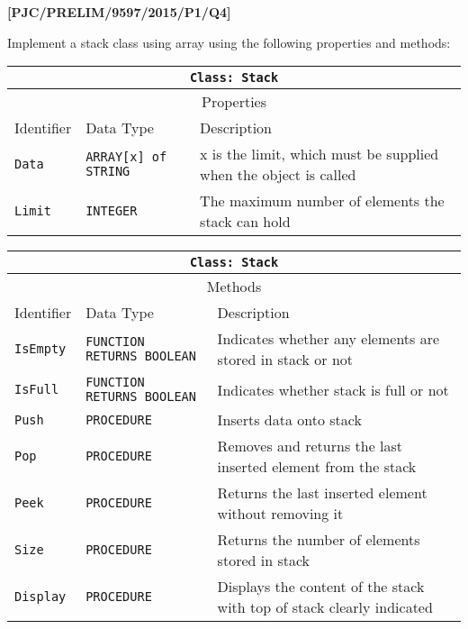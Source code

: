 \item \textbf{{[}PJC/PRELIM/9597/2015/P1/Q4{]} }

Implement a stack class using array using the following properties
and methods: 
\begin{center}
\begin{tabular}{|l|l|l|}
\hline 
\multicolumn{3}{|c|}{\texttt{Class: Stack}}\tabularnewline
\hline 
\multicolumn{3}{|c|}{Properties}\tabularnewline
\hline 
\texttt{\hspace{0.01\columnwidth}}Identifier & \texttt{\hspace{0.01\columnwidth}}Data Type & \texttt{\hspace{0.05\columnwidth}}Description\tabularnewline
\hline 
\texttt{Data} & \texttt{ARRAY{[}x{]} of STRING} & x is the limit, which must be supplied when the object is called \tabularnewline
\hline 
\texttt{Limit} & \texttt{INTEGER} & The maximum number of elements the stack can hold \tabularnewline
\hline 
\end{tabular}
\par\end{center}

\begin{center}
\begin{tabular}{|l|l|l|}
\hline 
\multicolumn{3}{|c|}{\texttt{Class: Stack}}\tabularnewline
\hline 
\multicolumn{3}{|c|}{Methods}\tabularnewline
\hline 
\texttt{\hspace{0.01\columnwidth}}Identifier & \texttt{\hspace{0.01\columnwidth}}Data Type & \texttt{\hspace{0.05\columnwidth}}Description\tabularnewline
\hline 
\texttt{IsEmpty} & \texttt{FUNCTION RETURNS BOOLEAN} & Indicates whether any elements are stored in stack or not \tabularnewline
\hline 
\texttt{IsFull} & \texttt{FUNCTION RETURNS BOOLEAN} & Indicates whether stack is full or not\tabularnewline
\hline 
\texttt{Push} & \texttt{PROCEDURE} & Inserts data onto stack\tabularnewline
\hline 
\texttt{Pop} & \texttt{PROCEDURE} & Removes and returns the last inserted element from the stack\tabularnewline
\hline 
\texttt{Peek} & \texttt{PROCEDURE} & Returns the last inserted element without removing it\tabularnewline
\hline 
\texttt{Size} & \texttt{PROCEDURE} & Returns the number of elements stored in stack \tabularnewline
\hline 
\texttt{Display} & \texttt{PROCEDURE} & Displays the content of the stack with top of stack clearly indicated\tabularnewline
\hline 
\end{tabular}
\par\end{center}

